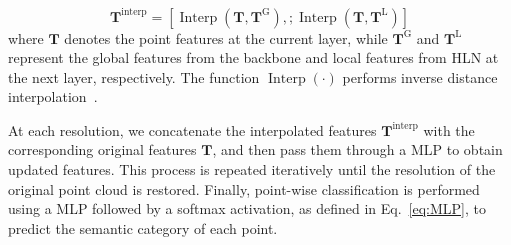 \begin{equation}
\boldsymbol{T}^{\text{interp}} = \left[\operatorname{Interp}(\boldsymbol{T}, \boldsymbol{T}^{\text{G}}),; \operatorname{Interp}(\boldsymbol{T}, \boldsymbol{T}^{\text{L}})\right]
\end{equation}
where $\boldsymbol{T}$ denotes the point features at the current layer, while $\boldsymbol{T}^{\text{G}}$ and $\boldsymbol{T}^{\text{L}}$ represent the global features from the backbone and local features from HLN at the next layer, respectively. The function $\operatorname{Interp}(\cdot)$ performs inverse distance interpolation~\cite{qian2022pointnext}.

At each resolution, we concatenate the interpolated features $\boldsymbol{T}^{\text{interp}}$ with the corresponding original features $\boldsymbol{T}$, and then pass them through a MLP to obtain updated features. This process is repeated iteratively until the resolution of the original point cloud is restored. Finally, point-wise classification is performed using a MLP followed by a softmax activation, as defined in Eq.~\eqref{eq:MLP}, to predict the semantic category of each point.

